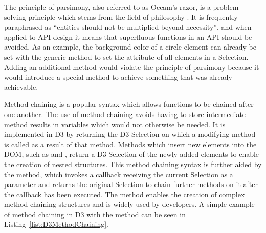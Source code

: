 The principle of parsimony, also referred to as Occam's razor, is a
problem-solving principle which stems from the field of philosophy
\parencite{PrincipleOfParsimony}. It is frequently paraphrased as
\enquote{entities should not be multiplied beyond necessity}, and when
applied to API design it means that superfluous functions in an API
should be avoided. As an example, the background color of a circle
element can already be set with the generic 
method to set the  attribute of all
elements in a Selection. Adding an additional
 method would violate the principle of
parsimony because it would introduce a special method to achieve
something that was already achievable.

Method chaining is a popular syntax which allows functions to be
chained after one another. The use of method chaining avoids having to
store intermediate method results in variables which would not
otherwise be needed. It is implemented in D3 by returning the D3
Selection on which a modifying method is called as a result of that
method. Methods which insert new elements into the DOM, such as
 and , return a D3
Selection of the newly added elements to enable the creation of nested
structures. This method chaining syntax is further aided by the
 method, which invokes a callback receiving the
current Selection as a parameter and returns the original Selection to
chain further methods on it after the callback has been executed. The
 method enables the creation of complex method
chaining structures and is widely used by developers. A simple example
of method chaining in D3 with the  method can be
seen in Listing~\ref{list:D3MethodChaining}.



\begin{samepage}
%
A simple example of method chaining in D3.
A  element and a  element are created
inside an existing  element.
},
]{listings/d3-method-chaining.js}
\end{samepage}


